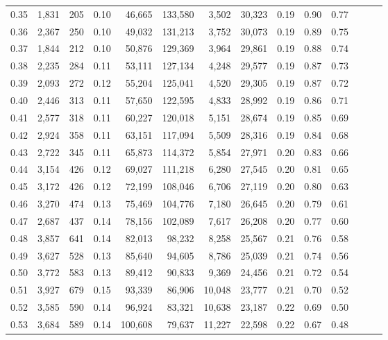 \begin{tabular}{rrrrrrrrrrrrrr}
0.35 &  1,831 &    205 &  0.10 &   46,665 &  133,580 &   3,502 &  30,323 &  0.19 &  0.90 &      0.77 \\
0.36 &  2,367 &    250 &  0.10 &   49,032 &  131,213 &   3,752 &  30,073 &  0.19 &  0.89 &      0.75 \\
0.37 &  1,844 &    212 &  0.10 &   50,876 &  129,369 &   3,964 &  29,861 &  0.19 &  0.88 &      0.74 \\
0.38 &  2,235 &    284 &  0.11 &   53,111 &  127,134 &   4,248 &  29,577 &  0.19 &  0.87 &      0.73 \\
0.39 &  2,093 &    272 &  0.12 &   55,204 &  125,041 &   4,520 &  29,305 &  0.19 &  0.87 &      0.72 \\
0.40 &  2,446 &    313 &  0.11 &   57,650 &  122,595 &   4,833 &  28,992 &  0.19 &  0.86 &      0.71 \\
0.41 &  2,577 &    318 &  0.11 &   60,227 &  120,018 &   5,151 &  28,674 &  0.19 &  0.85 &      0.69 \\
0.42 &  2,924 &    358 &  0.11 &   63,151 &  117,094 &   5,509 &  28,316 &  0.19 &  0.84 &      0.68 \\
0.43 &  2,722 &    345 &  0.11 &   65,873 &  114,372 &   5,854 &  27,971 &  0.20 &  0.83 &      0.66 \\
0.44 &  3,154 &    426 &  0.12 &   69,027 &  111,218 &   6,280 &  27,545 &  0.20 &  0.81 &      0.65 \\
0.45 &  3,172 &    426 &  0.12 &   72,199 &  108,046 &   6,706 &  27,119 &  0.20 &  0.80 &      0.63 \\
0.46 &  3,270 &    474 &  0.13 &   75,469 &  104,776 &   7,180 &  26,645 &  0.20 &  0.79 &      0.61 \\
0.47 &  2,687 &    437 &  0.14 &   78,156 &  102,089 &   7,617 &  26,208 &  0.20 &  0.77 &      0.60 \\
0.48 &  3,857 &    641 &  0.14 &   82,013 &   98,232 &   8,258 &  25,567 &  0.21 &  0.76 &      0.58 \\
0.49 &  3,627 &    528 &  0.13 &   85,640 &   94,605 &   8,786 &  25,039 &  0.21 &  0.74 &      0.56 \\
0.50 &  3,772 &    583 &  0.13 &   89,412 &   90,833 &   9,369 &  24,456 &  0.21 &  0.72 &      0.54 \\
0.51 &  3,927 &    679 &  0.15 &   93,339 &   86,906 &  10,048 &  23,777 &  0.21 &  0.70 &      0.52 \\
0.52 &  3,585 &    590 &  0.14 &   96,924 &   83,321 &  10,638 &  23,187 &  0.22 &  0.69 &      0.50 \\
0.53 &  3,684 &    589 &  0.14 &  100,608 &   79,637 &  11,227 &  22,598 &  0.22 &  0.67 &      0.48 \\

\end{tabular}
